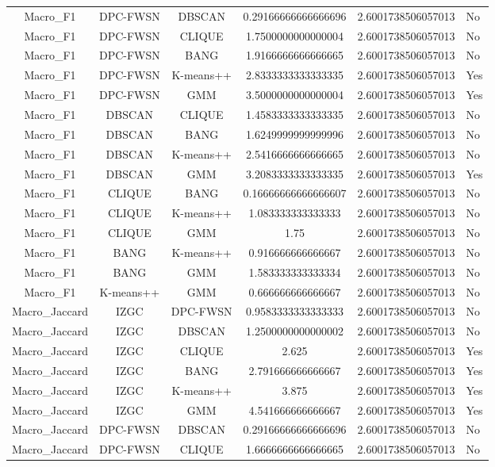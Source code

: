 \begin{table}[ht]
\begin{tabular}{cccc}
Macro_F1 & DPC-FWSN & DBSCAN & 0.29166666666666696 & 2.6001738506057013 & No\\
Macro_F1 & DPC-FWSN & CLIQUE & 1.7500000000000004 & 2.6001738506057013 & No\\
Macro_F1 & DPC-FWSN & BANG & 1.9166666666666665 & 2.6001738506057013 & No\\
Macro_F1 & DPC-FWSN & K-means++ & 2.8333333333333335 & 2.6001738506057013 & Yes\\
Macro_F1 & DPC-FWSN & GMM & 3.5000000000000004 & 2.6001738506057013 & Yes\\
Macro_F1 & DBSCAN & CLIQUE & 1.4583333333333335 & 2.6001738506057013 & No\\
Macro_F1 & DBSCAN & BANG & 1.6249999999999996 & 2.6001738506057013 & No\\
Macro_F1 & DBSCAN & K-means++ & 2.5416666666666665 & 2.6001738506057013 & No\\
Macro_F1 & DBSCAN & GMM & 3.2083333333333335 & 2.6001738506057013 & Yes\\
Macro_F1 & CLIQUE & BANG & 0.16666666666666607 & 2.6001738506057013 & No\\
Macro_F1 & CLIQUE & K-means++ & 1.083333333333333 & 2.6001738506057013 & No\\
Macro_F1 & CLIQUE & GMM & 1.75 & 2.6001738506057013 & No\\
Macro_F1 & BANG & K-means++ & 0.916666666666667 & 2.6001738506057013 & No\\
Macro_F1 & BANG & GMM & 1.583333333333334 & 2.6001738506057013 & No\\
Macro_F1 & K-means++ & GMM & 0.666666666666667 & 2.6001738506057013 & No\\
Macro_Jaccard & IZGC & DPC-FWSN & 0.9583333333333333 & 2.6001738506057013 & No\\
Macro_Jaccard & IZGC & DBSCAN & 1.2500000000000002 & 2.6001738506057013 & No\\
Macro_Jaccard & IZGC & CLIQUE & 2.625 & 2.6001738506057013 & Yes\\
Macro_Jaccard & IZGC & BANG & 2.791666666666667 & 2.6001738506057013 & Yes\\
Macro_Jaccard & IZGC & K-means++ & 3.875 & 2.6001738506057013 & Yes\\
Macro_Jaccard & IZGC & GMM & 4.541666666666667 & 2.6001738506057013 & Yes\\
Macro_Jaccard & DPC-FWSN & DBSCAN & 0.29166666666666696 & 2.6001738506057013 & No\\
Macro_Jaccard & DPC-FWSN & CLIQUE & 1.6666666666666665 & 2.6001738506057013 & No\\

\end{tabular}
\end{table}
